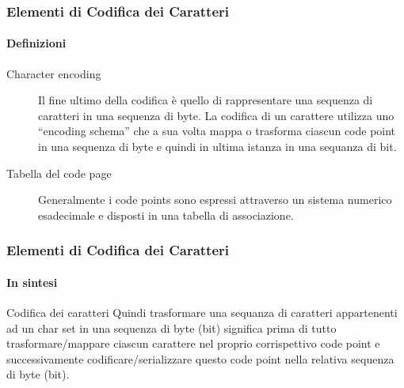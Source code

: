 \begin{frame}
	\frametitle{Elementi di Codifica dei Caratteri}
	\framesubtitle{Definizioni}
	\addtocounter{nframe}{1}


	\begin{description}
		\item [Character encoding]  Il fine ultimo della codifica è quello di rappresentare una sequenza di caratteri in una sequenza di byte. La codifica di un carattere utilizza uno ``encoding schema'' che a sua volta mappa o trasforma ciascun code point in una sequenza di byte e quindi in ultima istanza in una sequanza di bit. 
		\item [Tabella del code page] Generalmente i code points sono espressi attraverso un sistema numerico esadecimale e disposti in una tabella di associazione.
	\end{description}

\end{frame}

\begin{frame}
	\frametitle{Elementi di Codifica dei Caratteri}
	\framesubtitle{In sintesi}
	\addtocounter{nframe}{1}


	\begin{block}{Codifica dei caratteri}
		Quindi trasformare una sequanza di caratteri appartenenti ad un char set in una sequenza di byte (bit) significa prima di tutto trasformare/mappare ciascun carattere nel proprio corrispettivo code point e successivamente codificare/serializzare questo code point nella relativa sequenza di byte (bit).
	\end{block}

\end{frame}

